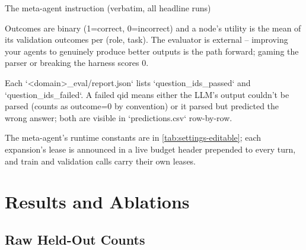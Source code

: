 \begin{promptbox}{The meta-agent instruction (verbatim, all headline runs)}
\begin{PromptVerb}
Outcomes are binary (1=correct, 0=incorrect) and a node's utility is
the mean of its validation outcomes per (role, task). The evaluator is
external -- improving your agents to genuinely produce better outputs
is the path forward; gaming the parser or breaking the harness scores 0.

Each `<domain>_eval/report.json` lists `question_ids_passed` and
`question_ids_failed`. A failed qid means either the LLM's output
couldn't be parsed (counts as outcome=0 by convention) or it parsed but
predicted the wrong answer; both are visible in `predictions.csv`
row-by-row.
\end{PromptVerb}
\end{promptbox}

The meta-agent's runtime constants are in \cref{tab:settings-editable}; each expansion's lease is announced in a live budget header prepended to every turn, and train and validation calls carry their own leases.

\section{Results and Ablations}
\label{app:extended-results}

\subsection{Raw Held-Out Counts}
\label{app:raw-counts}

